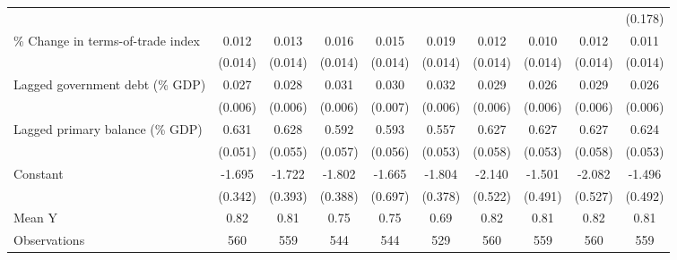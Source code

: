 {\begin{tabular}{l*{9}{c}}
                    &                     &                     &                     &                     &                     &                     &                     &                     &     (0.178)         \\
\addlinespace
\% Change in terms-of-trade index&       0.012         &       0.013         &       0.016         &       0.015         &       0.019         &       0.012         &       0.010         &       0.012         &       0.011         \\
                    &     (0.014)         &     (0.014)         &     (0.014)         &     (0.014)         &     (0.014)         &     (0.014)         &     (0.014)         &     (0.014)         &     (0.014)         \\
\addlinespace
Lagged government debt (\% GDP)&       0.027\sym{***}&       0.028\sym{***}&       0.031\sym{***}&       0.030\sym{***}&       0.032\sym{***}&       0.029\sym{***}&       0.026\sym{***}&       0.029\sym{***}&       0.026\sym{***}\\
                    &     (0.006)         &     (0.006)         &     (0.006)         &     (0.007)         &     (0.006)         &     (0.006)         &     (0.006)         &     (0.006)         &     (0.006)         \\
\addlinespace
Lagged primary balance (\% GDP)&       0.631\sym{***}&       0.628\sym{***}&       0.592\sym{***}&       0.593\sym{***}&       0.557\sym{***}&       0.627\sym{***}&       0.627\sym{***}&       0.627\sym{***}&       0.624\sym{***}\\
                    &     (0.051)         &     (0.055)         &     (0.057)         &     (0.056)         &     (0.053)         &     (0.058)         &     (0.053)         &     (0.058)         &     (0.053)         \\
\addlinespace
Constant            &      -1.695\sym{***}&      -1.722\sym{***}&      -1.802\sym{***}&      -1.665\sym{**} &      -1.804\sym{***}&      -2.140\sym{***}&      -1.501\sym{***}&      -2.082\sym{***}&      -1.496\sym{***}\\
                    &     (0.342)         &     (0.393)         &     (0.388)         &     (0.697)         &     (0.378)         &     (0.522)         &     (0.491)         &     (0.527)         &     (0.492)         \\
\midrule
Mean Y              &        0.82         &        0.81         &        0.75         &        0.75         &        0.69         &        0.82         &        0.81         &        0.82         &        0.81         \\
Observations        &         560         &         559         &         544         &         544         &         529         &         560         &         559         &         560         &         559         \\
\bottomrule
\end{tabular}
}
